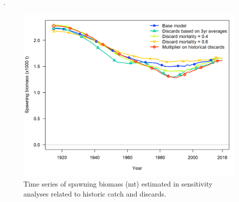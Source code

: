 \documentclass[12pt,]{article}
\begin{document}
\begin{minipage}{\linewidth}%
\label{fig:Sensitivity_sel_and_Q}%
\begin{centering}.
\end{centering}
\end{minipage}

\FloatBarrier

\begin{figure}
\centering
\includegraphics{Figures/sens.catch_compare1_spawnbio.png}
\caption{Time series of spawning biomass (mt) estimated in sensitivity
analyses related to historic catch and discards.
\label{fig:Sensitivity_catch}}
\end{figure}
\end{document}
